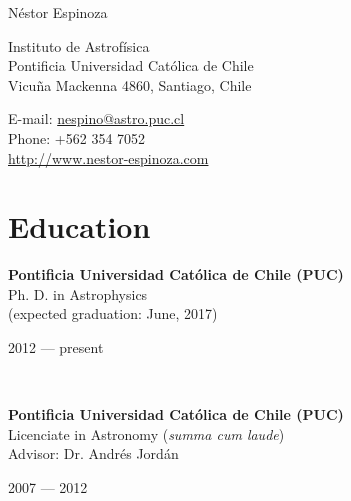 \documentclass[11pt, a4paper]{article} %
\begin{document}

{\LARGE N\'estor Espinoza}\\[0.2cm] %
\begin{minipage}[t]{0.63\textwidth}
Instituto de Astrof\'isica\\
Pontificia Universidad Cat\'olica de Chile\\
Vicu\~na Mackenna 4860, Santiago, Chile\\
\end{minipage}
\begin{minipage}[t]{0.37\textwidth}
E-mail: \href{mailto:nespino@astro.puc.cl}{nespino@astro.puc.cl}\\
Phone: +562 354 7052\\ 
\url{http://www.nestor-espinoza.com}
\end{minipage}

\hrulefill
\section*{Education}


\begin{minipage}[t]{0.6\textwidth}
\begin{flushleft}%
  \setlength{\leftskip}{0.2cm}%
\textbf{Pontificia Universidad Cat\'olica de Chile (PUC)}\\
 Ph. D. in Astrophysics\\
 (expected graduation: June, 2017)
 
\end{flushleft}
\end{minipage}
\begin{minipage}[t]{0.4\textwidth}
\hfill 2012 --- present 
\end{minipage}\\

\begin{minipage}[t]{0.6\textwidth}
\begin{flushleft}%
  \setlength{\leftskip}{0.2cm}%
\textbf{Pontificia Universidad Cat\'olica de Chile (PUC)}\\
 Licenciate in Astronomy (\textit{summa cum laude})\\
 Advisor: Dr. Andr\'es Jord\'an
 \end{flushleft}
\end{minipage}
\begin{minipage}[t]{0.4\textwidth}
\hfill 2007 --- 2012 
\end{minipage}
\end{document}
